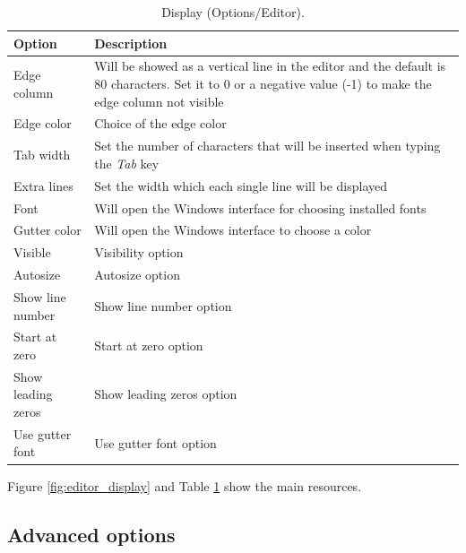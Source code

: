 \begin{table}
  \begin{footnotesize}
    \begin{tabularx}{\textwidth}{>{\hsize=0.3\hsize}X>{\hsize=0.7\hsize}X}\\
      \hline
      \textbf{Option} & \textbf{Description} \\
      \hline  %
      Edge column & Will be showed as a vertical line in the editor and the default is 80 characters.
      Set it to 0 or a negative value (-1) to make the edge column not visible \\
      Edge color & Choice of the edge color \\
      Tab width & Set the number of characters that will be inserted when typing the \textit{Tab} key \\
      Extra lines & Set the width which each single line will be displayed \\
      Font & Will open the Windows interface for choosing installed fonts \\
      \hline %
      Gutter color & Will open the Windows interface to choose a color \\
      Visible & Visibility option \\
      Autosize & Autosize option \\
      Show line number & Show line number option \\
      Start at zero & Start at zero option \\
      Show leading zeros & Show leading zeros option \\
      Use gutter font & Use gutter font option \\
      \hline
    \end{tabularx}
  \end{footnotesize}
  \caption{Display (Options/Editor).}
  \label{tab:editor_display}
\end{table}

Figure \ref{fig:editor_display} and
Table \ref{tab:editor_display}
show the main resources.

\hypertarget{working_editor_advanced}{}
\subsection{Advanced options}

